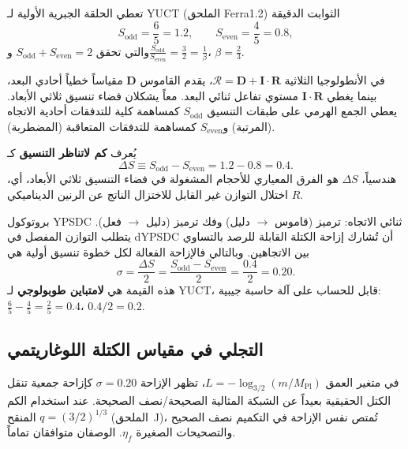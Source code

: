 \documentclass[12pt,a4paper]{article}
\begin{document}
	تعطي الحلقة الجبرية الأولية لـ YUCT (الملحق Ferra1.2) الثوابت الدقيقة
	\begin{equation}
		S_{\mathrm{odd}} = \frac{6}{5} = 1.2,\qquad S_{\mathrm{even}} = \frac{4}{5} = 0.8,
	\end{equation}
	والتي تحقق \(\displaystyle S_{\mathrm{odd}}+S_{\mathrm{even}}=2\) و\(\displaystyle \frac{S_{\mathrm{odd}}}{S_{\mathrm{even}}}=\frac{3}{2}=\frac{1}{\beta}\)، \(\beta=\frac{2}{3}\).
	
	في الأنطولوجيا الثلاثية \(\mathcal{R}=\mathbf{D}+\mathbf{I}\!\cdot\!\mathbf{R}\)، يقدم القاموس \(\mathbf{D}\) مقياساً خطياً أحادي البعد، بينما يغطي \(\mathbf{I}\!\cdot\!\mathbf{R}\) مستوي تفاعل ثنائي البعد. معاً يشكلان فضاء تنسيق ثلاثي الأبعاد. يعطي الجمع الهرمي على طبقات التنسيق \(S_{\mathrm{odd}}\) كمساهمة كلية للتدفقات أحادية الاتجاه (المرتبة) و\(S_{\mathrm{even}}\) كمساهمة للتدفقات المتعاقبة (المضطربة).
	
	يُعرف \textbf{كم لاتناظر التنسيق} كـ
	\begin{equation}
		\Delta S \equiv S_{\mathrm{odd}} - S_{\mathrm{even}} = 1.2 - 0.8 = 0.4.
		\label{eq:DS}
	\end{equation}
	هندسياً، \(\Delta S\) هو الفرق المعياري للأحجام المشغولة في فضاء التنسيق ثلاثي الأبعاد، أي، اختلال التوازن غير القابل للاختزال الناتج عن الرنين الديناميكي \(R\).
	
	بروتوكول YPSDC ثنائي الاتجاه: ترميز (قاموس \(\to\) دليل) وفك ترميز (دليل \(\to\) فعل). يتطلب التوازن المفصل في dYPSDC أن تُشارك إزاحة الكتلة القابلة للرصد بالتساوي بين الاتجاهين. وبالتالي فالإزاحة الفعالة لكل خطوة تنسيق أولية هي
	\begin{equation}
		\boxed{\sigma = \frac{\Delta S}{2} = \frac{S_{\mathrm{odd}} - S_{\mathrm{even}}}{2} = \frac{0.4}{2} = 0.20.}
		\label{eq:sigma}
	\end{equation}
	هذه القيمة هي \textbf{لامتباين طوبولوجي} لـ YUCT، قابل للحساب على آلة حاسبة جيبية: \(\frac{6}{5} - \frac{4}{5} = \frac{2}{5} = 0.4\)، \(0.4/2 = 0.2\).
	
	\subsection{التجلي في مقياس الكتلة اللوغاريتمي}
	
	في متغير العمق \(L = -\log_{3/2}(m/M_{\mathrm{Pl}})\)، تظهر الإزاحة \(\sigma = 0.20\) كإزاحة جمعية تنقل الكتل الحقيقية بعيداً عن الشبكة المثالية الصحيحة/نصف الصحيحة. عند استخدام الكم المنقح \(q = (3/2)^{1/3}\) (الملحق~J)، تُمتص نفس الإزاحة في التكميم نصف الصحيح والتصحيحات الصغيرة \(\eta_f\). الوصفان متوافقان تماماً.
	
\end{document}
